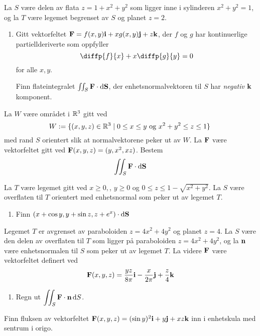 \oppgave[K2015, Oppgave 7]

La $S$ være delen av flata $z = 1 + x^2 + y^2$ som ligger inne i sylinderen $x^2
+ y^2 = 1$, og la $T$ være legemet begrenset av $S$ og planet $z = 2$.

\begin{enumerate}
  \item Gitt vektorfeltet $\mathbf{F} = f(x,y) \mathbf{i} + x g(x,y) \mathbf{j} + z \mathbf{k}$, der $f$ og
    $g$ har kontinuerlige partiellderiverte som oppfyller
    \begin{equation*}
      \diffp{f}{x} + x \diffp{g}{y} = 0
    \end{equation*}
    for alle $x, y$.

    Finn flateintegralet $\iint_S \mathbf{F} \cdot \mathop{}\! \mathrm{d} \mathbf{S}\mathop{}\!$, der enhetsnormalvektoren
    til $S$ har \emph{negativ} $\mathbf{k}$ komponent.
\end{enumerate}

\oppgave[V2014, Oppgave 7]

La $W$ være området i $\mathbb{R}^3$ gitt ved
%
\begin{equation*}
  W := \{ (x,y,z) \in \R^3 \mid 0 \leq x \leq y \ \text{og} \ x^2 + y^2 \leq z \leq 1 \}\,
\end{equation*}
%
med rand $S$ orientert slik at normalvektorene peker ut av $W$. La
$\mathbf{F}$ være vektorfeltet gitt ved $\mathbf{F}(x,y,z) = (y,x^2,xz)$. Bestem
%
\begin{equation*}
  \iint_{S} \mathbf{F} \cdot \mathop{}\! \mathrm{d} \mathbf{S}\mathop{}\!
\end{equation*}

\oppgave[K2013, Oppgave 7] La $T$ være legemet gitt ved $x \geq 0,$, $y \geq 0$
og $0 \leq z \leq 1 - \sqrt{x^2 + y^2}$. La $S$ være overflaten til $T$
orientert med enhetsnormal som peker ut av legemet $T$.

\begin{enumerate}
  \item Finn $\displaystyle (x + \cos y, y + \sin z, z + e^x) \cdot \mathop{}\! \mathrm{d} \mathbf{S}\mathop{}\!$
\end{enumerate}

\oppgave[K2012, Oppgave 6] Legemet $T$ er avgrenset av paraboloiden $z = 4x^2 +
4y^2$ og planet $z = 4$. La $S$ være den delen av overflaten til $T$ som ligger
på paraboloiden $z = 4x^2 + 4y^2$, og la $\mathbf{n}$ være enhetsnormalen til $S$
som peker ut av legemet $T$. La videre $\mathbf{F}$ være vektorfeltet definert ved
%
\begin{equation*}
  \mathbf{F}(x,y,z)
  = \frac{yz}{8\pi} \mathbf{i} - \frac{x}{2\pi}\mathbf{j} + \frac{z}{4}\mathbf{k}
\end{equation*}
%
\begin{enumerate}
  \item Regn ut $\displaystyle \iint_S \mathbf{F} \cdot \mathbf{n} \mathop{}\! \mathrm{d} S\mathop{}\!$.
\end{enumerate}


\oppgave[V2012, Oppgave 5] Finn fluksen av vektorfeltet $\mathbf{F}(x,y,z) = (\sin
y)^2\mathbf{i} + y\mathbf{j} + xz\mathbf{k}$ inn i enhetskula med sentrum i origo. 


